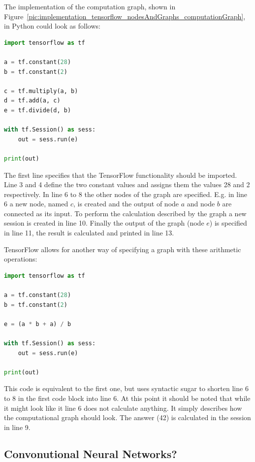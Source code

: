 \filbreak

The implementation of the computation graph, shown in Figure~\ref{pic:implementation_tensorflow_nodesAndGraphs_computationGraph}, in Python could look as follows:

\begin{lstlisting}[language=python]
import tensorflow as tf

a = tf.constant(28)
b = tf.constant(2)

c = tf.multiply(a, b)
d = tf.add(a, c)
e = tf.divide(d, b)

with tf.Session() as sess:
    out = sess.run(e)

print(out)

\end{lstlisting}

The first line specifies that the TensorFlow functionality should be imported. Line 3 and 4 define the two constant values and assigns them the values 28 and 2 respectively. In line 6 to 8 the other nodes of the graph are specified. E.g. in line 6 a new node, named $c$, is created and the output of node $a$ and node $b$ are connected as its input. To perform the calculation described by the graph a new session is created in line 10. Finally the output of the graph (node $e$) is specified in line 11, the result is calculated and printed in line 13.

TensorFlow allows for another way of specifying a graph with these arithmetic operations:

\begin{lstlisting}[language=python]
import tensorflow as tf

a = tf.constant(28)
b = tf.constant(2)

e = (a * b + a) / b

with tf.Session() as sess:
	out = sess.run(e)

print(out)

\end{lstlisting}

This code is equivalent to the first one, but uses syntactic sugar to shorten line 6 to 8 in the first code block into line 6. At this point it should be noted that while it might look like it line 6 does not calculate anything. It simply describes how the computational graph should look. The answer (42) is calculated in the session in line 9.

\subsection{Convonutional Neural Networks?}

